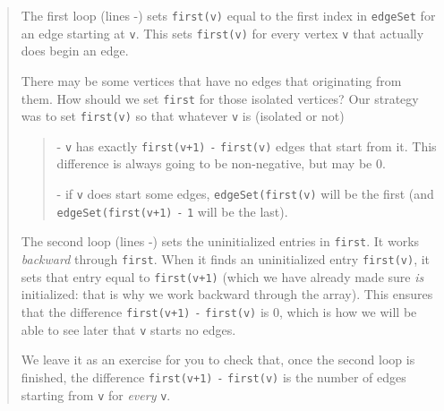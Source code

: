 \begin{quote}
The first loop (lines -)
sets {\tt first(v)} equal to the first index in {\tt edgeSet} for an edge starting at
{\tt v}.  This sets {\tt first(v)} for every vertex {\tt v} that actually does begin an edge. 

There may be some vertices that have no edges that originating from them.
How should we set {\tt first} for those isolated vertices?  Our strategy was to
set {\tt first(v)} so that whatever {\tt v} is (isolated or not)
\begin{quote}
- {\tt v} has exactly {\tt first(v+1)} {\tt -} {\tt first(v)} edges that start from it.
This difference is always going to be non-negative, but may be $0$.

- if {\tt v} does start some edges,  {\tt edgeSet(first(v)} will be the first
(and  {\tt edgeSet(first(v+1)} {\tt -} {\tt 1} will be the last).
\end{quote}

The second loop (lines -) sets
the uninitialized entries in {\tt first}.  It works {\em backward} through {\tt first}.
When it finds an uninitialized entry {\tt first(v)}, it sets that entry equal to
{\tt first(v+1)} (which we have already made sure {\em is} initialized: that is why we
work backward through the array).  This ensures that the difference
 {\tt first(v+1)} {\tt -} {\tt first(v)} is $0$, which is how we will be able to
 see later that {\tt v} starts no edges.  
 
 We leave it as an exercise for you to check that, once the second loop
 is finished, the difference  {\tt first(v+1)} {\tt -} {\tt first(v)} is the number
 of edges starting from {\tt v} for {\em every} {\tt v}.
\end{quote}

